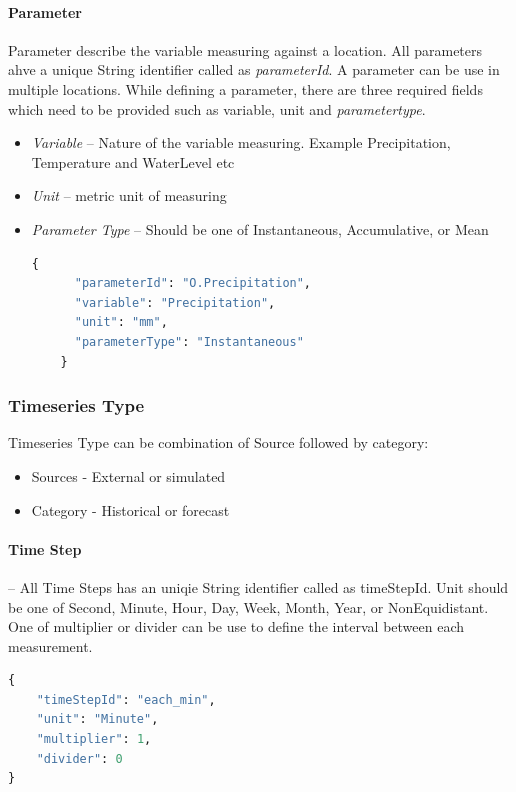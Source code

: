 \paragraph{Parameter}
Parameter describe the variable measuring against a location. All parameters ahve a unique String identifier called as \textit{parameterId}. A parameter can be use in multiple locations.
While defining a parameter, there are three required fields which need to be provided such as variable, unit and \textit{parametertype}.
\begin{itemize}  
  \item \emph{Variable} -- Nature of the variable measuring. Example Precipitation, Temperature and WaterLevel etc
  \item \emph{Unit} -- metric unit of measuring
  \item \emph{Parameter Type} -- Should be one of Instantaneous, Accumulative, or Mean
  \begin{lstlisting}[language=Python]
    {
      "parameterId": "O.Precipitation",
      "variable": "Precipitation",
      "unit": "mm",
      "parameterType": "Instantaneous"
    }
  \end{lstlisting}
\end{itemize}

\subsubsection{Timeseries Type}
Timeseries Type can be combination of Source followed by category:
\begin{itemize}
  \item Sources - External or simulated
  \item Category - Historical or forecast
\end{itemize}

\paragraph{Time Step}-- All Time Steps has an uniqie String identifier called as timeStepId. Unit should be one of Second, Minute, Hour, Day, Week, Month, Year, or NonEquidistant. One of multiplier or divider can be use to define the interval between each measurement.
\begin{lstlisting}[language=Python]
{
    "timeStepId": "each_min",
    "unit": "Minute",
    "multiplier": 1,
    "divider": 0
}
\end{lstlisting}

